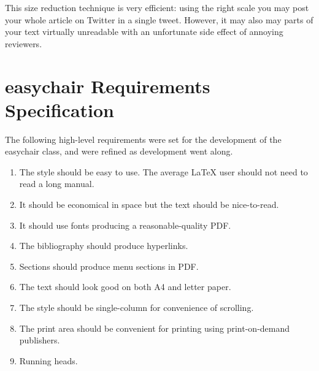\documentclass{easychair}
\newcommand{\easychair}{\textsf{easychair}}
\begin{document}
This size reduction technique is very efficient: using the right scale
you may post your whole article on Twitter in a single tweet. However,
it may also may parts of your text virtually unreadable with an
unfortunate side effect of annoying reviewers. 



\label{sect:bib}

%
%
%


\appendix
\section{{\easychair} Requirements Specification}
\label{sect:easychair-requirements}

The following high-level requirements were set for the development of 
the {\easychair} class, and were refined as development went along.

\begin{enumerate}
\item
The style should be easy to use. 
The average {\LaTeX} user should not need to read a long manual.

\item
It should be economical in space but the text should be nice-to-read.

\item
It should use fonts producing a reasonable-quality PDF.

\item
The bibliography should produce hyperlinks.

\item
Sections should produce menu sections in PDF.

\item
The text should look good on both A4 and letter paper.

\item
The style should be single-column for convenience of scrolling.

\item
The print area should be convenient for printing using print-on-demand publishers.

\item
Running heads.
\end{enumerate}


\end{document}
